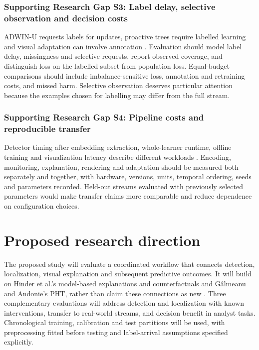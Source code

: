 \documentclass[10pt,a4paper]{article}
\begin{document}
\subsubsection*{Supporting Research Gap S3: Label delay, selective observation and decision costs}
ADWIN-U requests labels for updates, proactive trees require labelled learning and visual adaptation can involve annotation \cite{assis,guerrero,driftvis}. Evaluation should model label delay, missingness and selective requests, report observed coverage, and distinguish loss on the labelled subset from population loss. Equal-budget comparisons should include imbalance-sensitive loss, annotation and retraining costs, and missed harm. Selective observation deserves particular attention because the examples chosen for labelling may differ from the full stream.

\subsubsection*{Supporting Research Gap S4: Pipeline costs and reproducible transfer}
Detector timing after embedding extraction, whole-learner runtime, offline training and visualization latency describe different workloads \cite{greco,guerrero,kraus,driftvis,conceptexplorer}. Encoding, monitoring, explanation, rendering and adaptation should be measured both separately and together, with hardware, versions, units, temporal ordering, seeds and parameters recorded. Held-out streams evaluated with previously selected parameters would make transfer claims more comparable and reduce dependence on configuration choices.

\section{Proposed research direction}
The proposed study will evaluate a coordinated workflow that connects detection, localization, visual explanation and subsequent predictive outcomes. It will build on Hinder et al.'s model-based explanations and counterfactuals and G\^almeanu and Andonie's PHT, rather than claim these connections as new \cite{hinder2023,hinder2024,galmeanu}. Three complementary evaluations will address detection and localization with known interventions, transfer to real-world streams, and decision benefit in analyst tasks. Chronological training, calibration and test partitions will be used, with preprocessing fitted before testing and label-arrival assumptions specified explicitly.
\end{document}
